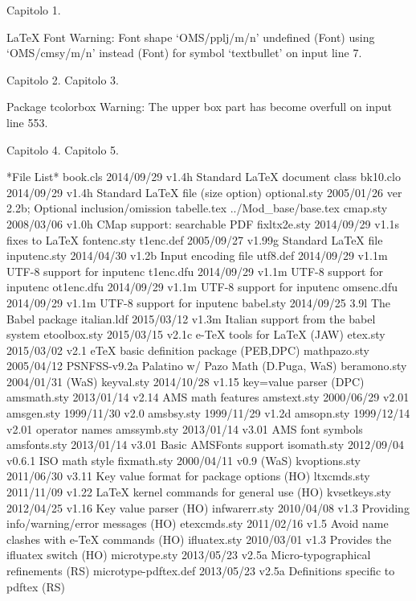 Capitolo 1.

LaTeX Font Warning: Font shape `OMS/pplj/m/n' undefined
(Font)              using `OMS/cmsy/m/n' instead
(Font)              for symbol `textbullet' on input line 7.

Capitolo 2.
Capitolo 3.

Package tcolorbox Warning: The upper box part has become overfull on input line 553.

Capitolo 4.
Capitolo 5.


 *File List*
    book.cls    2014/09/29 v1.4h Standard LaTeX document class
    bk10.clo    2014/09/29 v1.4h Standard LaTeX file (size option)
optional.sty    2005/01/26 ver 2.2b;  Optional inclusion/omission
 tabelle.tex
../Mod_base/base.tex
    cmap.sty    2008/03/06 v1.0h CMap support: searchable PDF
fixltx2e.sty    2014/09/29 v1.1s fixes to LaTeX
 fontenc.sty
   t1enc.def    2005/09/27 v1.99g Standard LaTeX file
inputenc.sty    2014/04/30 v1.2b Input encoding file
    utf8.def    2014/09/29 v1.1m UTF-8 support for inputenc
   t1enc.dfu    2014/09/29 v1.1m UTF-8 support for inputenc
  ot1enc.dfu    2014/09/29 v1.1m UTF-8 support for inputenc
  omsenc.dfu    2014/09/29 v1.1m UTF-8 support for inputenc
   babel.sty    2014/09/25 3.9l The Babel package
 italian.ldf    2015/03/12 v1.3m Italian support from the babel system
etoolbox.sty    2015/03/15 v2.1c e-TeX tools for LaTeX (JAW)
    etex.sty    2015/03/02 v2.1 eTeX basic definition package (PEB,DPC)
mathpazo.sty    2005/04/12 PSNFSS-v9.2a Palatino w/ Pazo Math (D.Puga, WaS) 
beramono.sty    2004/01/31 (WaS)
  keyval.sty    2014/10/28 v1.15 key=value parser (DPC)
 amsmath.sty    2013/01/14 v2.14 AMS math features
 amstext.sty    2000/06/29 v2.01
  amsgen.sty    1999/11/30 v2.0
  amsbsy.sty    1999/11/29 v1.2d
  amsopn.sty    1999/12/14 v2.01 operator names
 amssymb.sty    2013/01/14 v3.01 AMS font symbols
amsfonts.sty    2013/01/14 v3.01 Basic AMSFonts support
 isomath.sty    2012/09/04 v0.6.1 ISO math style
 fixmath.sty    2000/04/11 v0.9 (WaS)
kvoptions.sty    2011/06/30 v3.11 Key value format for package options (HO)
 ltxcmds.sty    2011/11/09 v1.22 LaTeX kernel commands for general use (HO)
kvsetkeys.sty    2012/04/25 v1.16 Key value parser (HO)
infwarerr.sty    2010/04/08 v1.3 Providing info/warning/error messages (HO)
etexcmds.sty    2011/02/16 v1.5 Avoid name clashes with e-TeX commands (HO)
ifluatex.sty    2010/03/01 v1.3 Provides the ifluatex switch (HO)
microtype.sty    2013/05/23 v2.5a Micro-typographical refinements (RS)
microtype-pdftex.def    2013/05/23 v2.5a Definitions specific to pdftex (RS)
